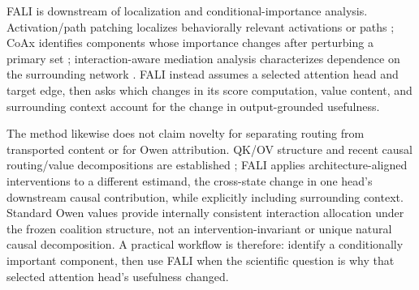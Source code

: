 FALI is downstream of localization and conditional-importance analysis. Activation/path patching localizes behaviorally relevant activations or paths \citep{goldowskydill2023pathpatching,zhang2024activationpatching,heimersheim2024activationpatching}; CoAx identifies components whose importance changes after perturbing a primary set \citep{gong2026coax}; interaction-aware mediation analysis characterizes dependence on the surrounding network \citep{vaidyanathan2026curse}. FALI instead assumes a selected attention head and target edge, then asks which changes in its score computation, value content, and surrounding context account for the change in output-grounded usefulness.

The method likewise does not claim novelty for separating routing from transported content or for Owen attribution. QK/OV structure and recent causal routing/value decompositions are established \citep{elhage2021mathematical,franco2025attentioncausal,wang2026fewshot}; FALI applies architecture-aligned interventions to a different estimand, the cross-state change in one head's downstream causal contribution, while explicitly including surrounding context. Standard Owen values provide internally consistent interaction allocation under the frozen coalition structure, not an intervention-invariant or unique natural causal decomposition. A practical workflow is therefore: identify a conditionally important component, then use FALI when the scientific question is why that selected attention head's usefulness changed.
